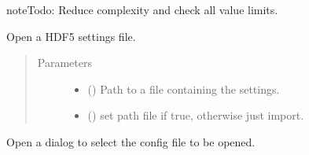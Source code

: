 \documentclass[a4paper,10pt,english]{sphinxmanual}
\begin{document}
\begin{fulllineitems}
\begin{fulllineitems}
\begin{quote}
\begin{description}
\end{description}\end{quote}

\begin{sphinxadmonition}{note}{\label{autodoc/mrsprint/mrsprint:index-5}Todo:}
Reduce complexity and check all value limits.
\end{sphinxadmonition}

\end{fulllineitems}


\begin{fulllineitems}
\label{\detokenize{autodoc/mrsprint/mrsprint:mrsprint.settings.Settings.open}}
Open a HDF5 settings file.
\begin{quote}\begin{description}
\item[{Parameters}] \leavevmode\begin{itemize}
\item {} 
 () \textendash{} Path to a file containing the settings.

\item {} 
 () \textendash{} set path file if true, otherwise just import.

\end{itemize}

\end{description}\end{quote}

\end{fulllineitems}


\begin{fulllineitems}
\label{\detokenize{autodoc/mrsprint/mrsprint:mrsprint.settings.Settings.openFile}}
Open a dialog to select the config file to be opened.

\end{fulllineitems}


\end{fulllineitems}
\end{document}
